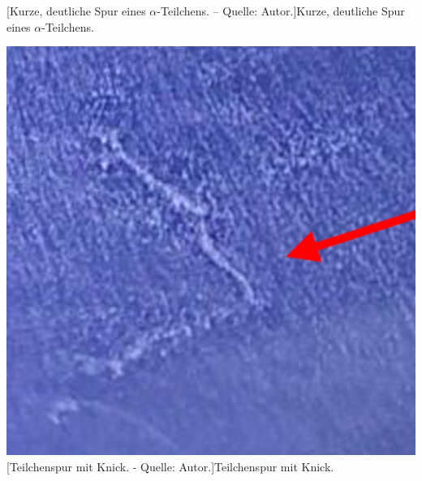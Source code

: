 \documentclass[a4paper,12pt]{article}
\begin{document}
\begin{table}
\begin{minipage}[t]{0.31\textwidth}
	[Kurze, deutliche Spur eines $\alpha$-Teilchens. -- Quelle: Autor.]{Kurze, deutliche Spur eines $\alpha$-Teilchens.}
	\label{fig:alpha}
	\end{minipage} \hfill
	\begin{minipage}[t]{0.31\textwidth}
	\includegraphics[width=\textwidth, valign=t]{Knick_scaled}
	[Teilchenspur mit \glqq Knick\grqq. - Quelle: Autor.]{Teilchenspur mit \glqq Knick\grqq.}
	\label{fig:knick}
	\end{minipage}

\end{table} 
\newpage
\end{document}
